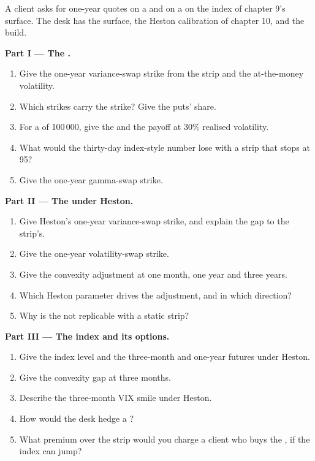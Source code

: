 \begin{problem}\label{pb:dv:variance-swaps-and-volatility-derivatives:1}
A client asks for one-year quotes on a  and on a  on the index of chapter 9's surface.
The desk has the surface, the Heston calibration of chapter 10, and the build.

\medskip\noindent\textbf{Part I --- The .}
\begin{enumerate}
\item Give the one-year variance-swap strike from the strip and the at-the-money volatility.
\item Which strikes carry the strike? Give the puts' share.
\item For a  of 100\,000, give the  and the payoff at 30\% realised volatility.
\item What would the thirty-day index-style number lose with a strip that stops at 95?
\item Give the one-year gamma-swap strike.
\end{enumerate}

\medskip\noindent\textbf{Part II --- The  under Heston.}
\begin{enumerate}[resume]
\item Give Heston's one-year variance-swap strike, and explain the gap to the strip's.
\item Give the one-year volatility-swap strike.
\item Give the convexity adjustment at one month, one year and three years.
\item Which Heston parameter drives the adjustment, and in which direction?
\item Why is the  not replicable with a static strip?
\end{enumerate}

\medskip\noindent\textbf{Part III --- The index and its options.}
\begin{enumerate}[resume]
\item Give the index level and the three-month and one-year futures under Heston.
\item Give the convexity gap at three months.
\item Describe the three-month VIX smile under Heston.
\item How would the desk hedge a ?
\item What premium over the strip would you charge a client who buys the , if the index can jump?
\end{enumerate}


\end{problem}
